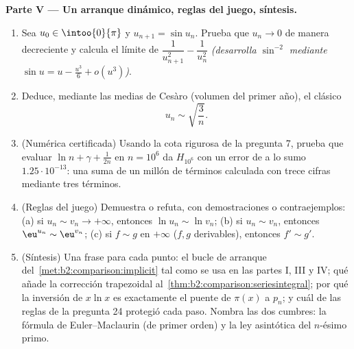 \begin{problem}
\medskip
\noindent\textbf{Parte V --- Un arranque dinámico, reglas del
juego, síntesis.}
\begin{enumerate}[resume]
  \item Sea $u_0 \in \intoo{0}{\pi}$ y $u_{n+1} = \sin u_n$. Prueba
        que $u_n \to 0$ de manera decreciente y calcula el límite de
        $\dfrac{1}{u_{n+1}^2} - \dfrac{1}{u_n^2}$ \emph{(desarrolla
        $\sin^{-2}$ mediante $\sin u = u - \frac{u^3}6 + o(u^3)$)}.
  \item Deduce, mediante las medias de Cesàro (volumen del primer
        año), el clásico
        \[
        u_n \sim \sqrt{\frac{3}{n}} .
        \]
  \item (Numérica certificada) Usando la cota rigurosa de la
        pregunta 7, prueba que evaluar $\ln n + \gamma + \frac1{2n}$
        en $n = 10^6$ da $H_{10^6}$ con un error de a lo sumo
        $1.25\cdot10^{-13}$: una suma de un millón de términos
        calculada con trece cifras mediante tres términos.
  \item (Reglas del juego) Demuestra o refuta, con demostraciones o
        contraejemplos: (a) si $u_n \sim v_n \to +\infty$, entonces
        $\ln u_n \sim \ln v_n$; (b) si $u_n \sim v_n$, entonces
        $\eu^{u_n} \sim \eu^{v_n}$; (c) si $f \sim g$ en $+\infty$
        ($f, g$ derivables), entonces $f' \sim g'$.
  \item (Síntesis) Una frase para cada punto: el bucle de arranque
        del~\cref{met:b2:comparison:implicit} tal como se usa en las
        partes I, III y IV; qué añade la corrección trapezoidal al~\cref{thm:b2:comparison:seriesintegral}; por qué la
        inversión de $x\ln x$ es exactamente el puente de $\pi(x)$ a
        $p_n$; y cuál de las reglas de la pregunta 24 protegió cada
        paso. Nombra las dos cumbres: la fórmula de Euler--Maclaurin
        (de primer orden) y la ley asintótica del $n$-ésimo primo.
\end{enumerate}
\end{problem}
